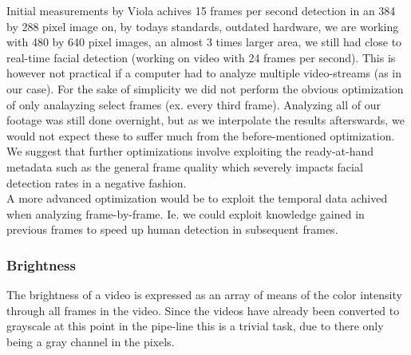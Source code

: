 Initial measurements by Viola achives 15 frames per second detection in an 384 by 288 pixel image on, by todays standards, outdated hardware, we are working with 480 by 640 pixel images, an almost 3 times larger area, we still had close to real-time facial detection (working on video with 24 frames per second). This is however not practical if a computer had to analyze multiple video-streams (as in our case). For the sake of simplicity we did not perform the obvious optimization of only analayzing select frames (ex. every third frame). Analyzing all of our footage was still done overnight, but as we interpolate the results afterswards, we would not expect these to suffer much from the before-mentioned optimization.\\
We suggest that further optimizations involve exploiting the ready-at-hand metadata such as the general frame quality which severely impacts facial detection rates in a negative fashion.\\
A more advanced optimization would be to exploit the temporal data achived when analyzing frame-by-frame. Ie. we could exploit knowledge gained in previous frames to speed up human detection in subsequent frames.

%
\subsubsection{Brightness}
%
The brightness of a video is expressed as an array of means
%
%
of the color intensity through all frames in the video. Since the videos have already been converted to grayscale at this point in the pipe-line this is a trivial task, due to there only being a gray channel in the pixels.
%
